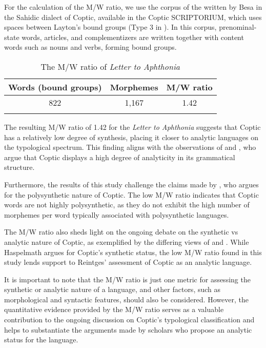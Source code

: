 \documentclass[output=paper,colorlinks,citecolor=brown ,chinesefont]{langscibook}
\begin{document}
For the calculation of the M/W ratio, we use the corpus of the  written by Besa in the Sahidic dialect of Coptic, available in the Coptic SCRIPTORIUM, which uses spaces between Layton's bound groups (Type 3 in ). In this corpus, prenominal-state words, articles, and complementizers are written together with content words such as nouns and verbs, forming bound groups.

\begin{table}
    \centering
    \begin{tabular}{ccc}\lsptoprule 
     Words (bound groups) &	Morphemes &	M/W ratio \\ \midrule
    822	& 1,167	 & 1.42 \\ \lspbottomrule
    \end{tabular}
    \caption{The M/W ratio of \textit{Letter to Aphthonia}}
    \label{tab:aphthonia}
\end{table}


The resulting M/W ratio of 1.42 for the \textit{Letter to Aphthonia} suggests that Coptic has a relatively low degree of synthesis, placing it closer to analytic languages on the typological spectrum. This finding aligns with the observations of \citet{reintges1,reintges2} and \citet{egedi}, who argue that Coptic displays a high degree of analyticity in its grammatical structure.

Furthermore, the results of this study challenge the claims made by \citet{loprieno1}, who argues for the polysynthetic nature of Coptic. The low M/W ratio indicates that Coptic words are not highly polysynthetic, as they do not exhibit the high number of morphemes per word typically associated with polysynthetic languages.

The M/W ratio also sheds light on the ongoing debate on the synthetic vs analytic nature of Coptic, as exemplified by the differing views of \citet{haspelmath} and \citet{reintges1}. While Haspelmath argues for Coptic's synthetic status, the low M/W ratio found in this study lends support to Reintges' assessment of Coptic as an analytic language.

It is important to note that the M/W ratio is just one metric for assessing the synthetic or analytic nature of a language, and other factors, such as morphological and syntactic features, should also be considered. However, the quantitative evidence provided by the M/W ratio serves as a valuable contribution to the ongoing discussion on Coptic's typological classification and helps to substantiate the arguments made by scholars who propose an analytic status for the language.
\end{document}
